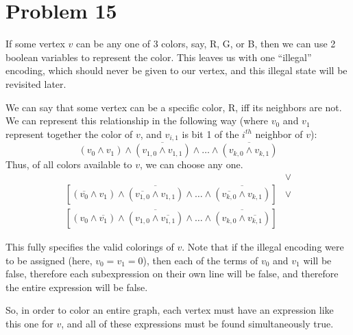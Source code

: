 \documentclass{article}
\providecommand{\prob}[1]{\section*{Problem #1}}
\begin{document}
\pagebreak
\prob{15}
If some vertex $v$ can be any one of 3 colors, say, R, G, or B, then we can use 2 boolean variables to represent the color.
This leaves us with one ``illegal'' encoding, which should never be given to our vertex, and this illegal state will be revisited later.

We can say that some vertex can be a specific color, R, iff its neighbors are not.
We can represent this relationship in the following way (where $v_0$ and $v_1$ represent together the color of $v$, and $v_{i, 1}$ is bit 1 of the $i^{th}$ neighbor of $v$):
\[
  (v_0 \land v_1) \land
  \overline{(v_{1,0} \land v_{1,1})} \land \dots \land
  \overline{(v_{k,0} \land v_{k,1})}
\]
Thus, of all colors available to $v$, we can choose any one.
\begin{align*}
  [
    (v_0 \land v_1) \land
    \overline{(v_{1,0} \land v_{1,1})} \land \dots \land
    \overline{(v_{k,0} \land v_{k,1})}
  ] &\lor\\ [
    (\overline{v_0} \land v_1) \land
    \overline{(\overline{v_{1,0}} \land v_{1,1})} \land \dots \land
    \overline{(\overline{v_{k,0}} \land v_{k,1})}
  ] &\lor\\ [
    (v_0 \land \overline{v_1}) \land
    \overline{(v_{1,0} \land \overline{v_{1,1}})} \land \dots \land
    \overline{(v_{k,0} \land \overline{v_{k,1}})}
  ]
\end{align*}

This fully specifies the valid colorings of $v$.
Note that if the illegal encoding were to be assigned (here, $v_0 = v_1 = 0$), then each of the terms of $v_0$ and $v_1$ will be false, therefore each subexpression on their own line will be false, and therefore the entire expression will be false.

So, in order to color an entire graph, each vertex must have an expression like this one for $v$, and all of these expressions must be found simultaneously true.
\end{document}
